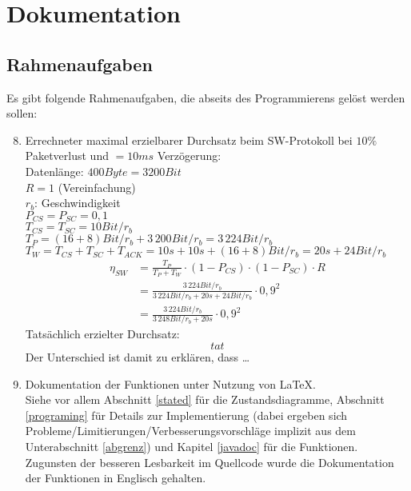 \maketitle
\newpage
\tableofcontents
\newpage

\chapter{Dokumentation}

\section{Rahmenaufgaben}

Es gibt folgende Rahmenaufgaben, die abseits des Programmierens gelöst werden sollen:
\begin{enumerate}
\setcounter{enumi}{7}
\item Errechneter maximal erzielbarer Durchsatz beim SW-Protokoll bei $10\%$ Paketverlust und $=10\unit{ms}$ Verzögerung:\\
Datenlänge: $400 \unit{Byte} = 3200\unit{Bit}$\\
$R=1$ (Vereinfachung)\\
$r_b$: Geschwindigkeit\\
$P_{CS}=P_{SC}=0,1$\\
$T_{CS}=T_{SC}=10\unit{Bit}/r_b$\\
$T_P=(16+8)\unit{Bit}/r_b+3\,200\unit{Bit}/r_b=3\,224\unit{Bit}/r_b$ \\
$T_W=T_{CS}+T_{SC}+T_{ACK}=10\unit{s}+10\unit{s}+(16+8)\unit{Bit}/r_b=20\unit{s}+24\unit{Bit}/r_b$
\begin{align*}
\eta_{SW}&=\frac{T_P}{T_P+ T_W}\cdot (1-P_{CS})\cdot(1-P_{SC}) \cdot R \\
&= \frac{3\,224\unit{Bit}/r_b}{3\,224\unit{Bit}/r_b+20\unit{s}+24\unit{Bit}/r_b}\cdot 0,9^2\\
&=\frac{3\,224\unit{Bit}/r_b}{3\,248\unit{Bit}/r_b+20\unit{s}}\cdot 0,9^2
\end{align*}
Tatsächlich erzielter Durchsatz:
$$tat$$
Der Unterschied ist damit zu erklären, dass …
\item Dokumentation der Funktionen unter Nutzung von \LaTeX{}.\\
Siehe vor allem Abschnitt \ref{stated} für die Zustandsdiagramme, Abschnitt \ref{programing} für Details zur Implementierung (dabei ergeben sich Probleme/Limitierungen/Verbesserungsvorschläge implizit aus dem Unterabschnitt \ref{abgrenz})  und Kapitel \ref{javadoc} für die Funktionen. Zugunsten der besseren Lesbarkeit im Quellcode wurde die Dokumentation der Funktionen in Englisch gehalten.
\end{enumerate}

